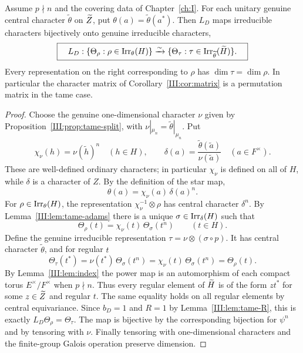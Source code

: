 \begin{theorem}\label{III:thm:tame-transfer}
Assume $p\nmid n$ and the covering data of Chapter~\ref{ch:I}.
For each unitary genuine central character $\widetilde\theta$
on $\widetilde Z$, put $\theta(a)=\widetilde\theta(a^*)$.
Then $L_D$ maps irreducible characters bijectively onto
genuine irreducible characters,
\[
\boxed{\quad
L_D:\{\Theta_\rho:\rho\in\operatorname{Irr}_\theta(H)\}
\xrightarrow{\sim}
\{\Theta_\tau:\tau\in\operatorname{Irr}_{\widetilde\theta}(\widetilde H)\}.
\quad}
\]
Every representation on the right corresponding to $\rho$
has $\dim\tau=\dim\rho$. In particular the character matrix
of Corollary~\ref{III:cor:matrix} is a permutation matrix in the
tame case.
\end{theorem}
\begin{proof}
Choose the genuine one-dimensional character $\nu$ given by
Proposition~\ref{III:prop:tame-split}, with
$\nu|_{\mu_n}=\widetilde\theta|_{\mu_n}$. Put
\[
\chi_\nu(h)=\nu(\widetilde h)^n\quad(h\in H),\qquad
\delta(a)=\frac{\widetilde\theta(\widetilde a)}
{\nu(\widetilde a)}\quad(a\in F^\times).
\]
These are well-defined ordinary characters; in particular
$\chi_\nu$ is defined on all of $H$, while $\delta$ is a
character of $Z$. By the definition of the star map,
\[
\theta(a)=\chi_\nu(a)\,\delta(a)^n.
\]
For $\rho\in\operatorname{Irr}_\theta(H)$, the representation
$\chi_\nu^{-1}\otimes\rho$ has central character $\delta^n$.
By Lemma~\ref{III:lem:tame-adams} there is a unique
$\sigma\in\operatorname{Irr}_\delta(H)$ such that
\[
\Theta_\rho(t)=\chi_\nu(t)\,\Theta_\sigma(t^n)
\qquad(t\in H).
\]
Define the genuine irreducible representation
$\tau=\nu\otimes(\sigma\circ p)$.
It has central character $\widetilde\theta$, and for regular $t$
\[
\Theta_\tau(t^*)
=\nu(t^*)\,\Theta_\sigma(t^n)
=\chi_\nu(t)\,\Theta_\sigma(t^n)
=\Theta_\rho(t).
\]
By Lemma~\ref{III:lem:index} the power map is an automorphism of
each compact torus $E^\times/F^\times$ when $p\nmid n$.
Thus every regular element of $\widetilde H$ is of the form $z t^*$
for some $z\in\widetilde Z$ and regular $t$. The same equality holds
on all regular elements by central equivariance.
Since $b_D=1$ and $R=1$ by Lemma~\ref{III:lem:tame-R}, this is
exactly $L_D\Theta_\rho=\Theta_\tau$.
The map is bijective by the corresponding bijection for
$\psi^n$ and by tensoring with $\nu$. Finally tensoring with
one-dimensional characters and the finite-group Galois
operation preserve dimension.
\end{proof}

